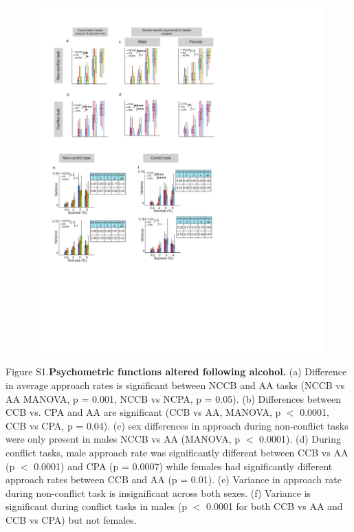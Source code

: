 \documentclass{article}
\newcounter{suppfig}
\renewcommand{\thesuppfig}{S\arabic{suppfig}}  %
\newenvironment{suppfigure}[1][htbp]
  {\refstepcounter{suppfig}%
   \begin{figure}[#1]%
   \renewcommand{\thefigure}{\thesuppfig}}%
  {\end{figure}}
\begin{document}
\begin{suppfigure}
\centering
\includegraphics[width=\textwidth, trim=50 100 50 100]{Figs/Alcohol_SI_1.pdf}
\label{fig:Alcohol_SI_1}
\end{suppfigure}

\clearpage

\begin{singlespace}
\noindent Figure S1.\textbf{Psychometric functions altered following alcohol.} (a) Difference in average approach rates is significant between NCCB and AA tasks (NCCB vs AA MANOVA, p = 0.001, NCCB vs NCPA, p = 0.05). (b) Differences between CCB vs. CPA and AA are significant (CCB vs AA, MANOVA, p $<$ 0.0001, CCB vs CPA, p = 0.04). (c) sex differences in approach during non-conflict tasks were only present in males NCCB vs AA (MANOVA, p $<$ 0.0001). (d) During conflict tasks, male approach rate was significantly different between CCB vs AA (p $<$ 0.0001) and CPA (p = 0.0007) while females had significantly different approach rates between CCB and AA (p = 0.01). (e) Variance in approach rate during non-conflict task is insignificant across both sexes. (f) Variance is significant during conflict tasks in males (p $<$ 0.0001 for both CCB vs AA and CCB vs CPA) but not females.
\end{singlespace}
\end{document}
